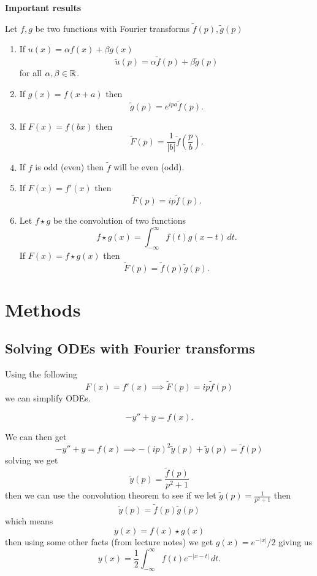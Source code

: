 \documentclass[10pt, a4paper]{article}
\begin{document}
\textbf{Important results}

Let $f, g$ be two functions with Fourier transforms $\tilde{f}(p), \tilde{g}(p)$
\begin{enumerate}[label = (\roman*)]
    \item
    If $u(x) = \alpha f(x) + \beta g(x)$
    \[
    \tilde{u}(p) = \alpha\tilde{f}(p) + \beta\tilde{g}(p)
    \]
    for all $\alpha, \beta \in \mathbb{R}$.

    \item
    If $g(x) = f(x + a)$ then
    \[
    \tilde{g}(p) = e ^ {ipa}\tilde{f}(p).
    \]

    \item
    If $F(x) = f(bx)$ then
    \[
    \tilde{F}(p) = \frac{1}{|b|}\tilde{f}\left(\frac{p}{b}\right).
    \]

    \item
    If $f$ is odd
    (even)
    then $\tilde{f}$ will be even
    (odd).

    \item
    If $F(x) = f'(x)$ then
    \[
    \tilde{F}(p) = ip\tilde{f}(p).
    \]

    \item
    Let $f \star g$ be the convolution of two functions
    \[
    f \star g(x) = \int_{-\infty}^{\infty}f(t)g(x - t)\,dt.
    \]
    If $F(x) = f \star g(x)$ then
    \[
    \tilde{F}(p) = \tilde{f}(p)\tilde{g}(p).
    \]
\end{enumerate}

\newpage

\section{Methods}

\subsection{Solving ODEs with Fourier transforms}
Using the following
\[
F(x) = f'(x) \implies \tilde{F}(p) = ip\tilde{f}(p)
\]
we can simplify ODEs.

\begin{example}
    \[
    -y'' + y = f(x).
    \]

    We can then get
    \[
    -y'' + y = f(x) \implies -(ip) ^ 2\tilde{y}(p) + \tilde{y}(p) = \tilde{f}(p)
    \]
    solving we get
    \[
    \tilde{y}(p) = \frac{\tilde{f}(p)}{p ^ 2 + 1}
    \]
    then we can use the convolution theorem to see if we let $\tilde{g}(p) = \frac{1}{p ^ 2 + 1}$ then
    \[
    \tilde{y}(p) = \tilde{f}(p)\tilde{g}(p)
    \]
    which means
    \[
    y(x) = f(x) \star g(x)
    \]
    then using some other facts
    (from lecture notes)
    we get $g(x) = e ^ {-|x|} / 2$ giving us
    \[
    y(x) = \frac{1}{2}\int_{-\infty}^{\infty}f(t)e ^ {-|x - t|}\,dt.
    \]
\end{example}
\end{document}
